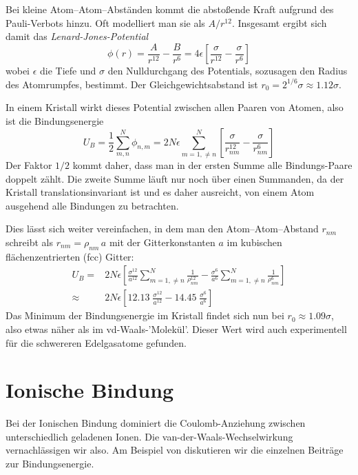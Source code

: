 Bei kleine Atom--Atom--Abständen kommt die abstoßende Kraft aufgrund des Pauli-Verbots hinzu. Oft modelliert man sie als $A/r^{12}$. Insgesamt ergibt sich damit das \emph{Lenard-Jones-Potential}
\begin{equation}
\phi(r) = \frac{A}{r^{12}} - \frac{B}{r^{6}} = 4 \epsilon \left[ \frac{\sigma}{r^{12}} -  \frac{\sigma}{r^{6}} \right]
\end{equation}
wobei $\epsilon$ die Tiefe und $\sigma$ den Nulldurchgang des Potentials, sozusagen den Radius des Atomrumpfes, bestimmt. Der Gleichgewichtsabstand ist $r_0 = 2^{1/6} \sigma \approx 1.12 \sigma$.

In einem Kristall wirkt dieses Potential zwischen allen Paaren von Atomen, also ist die Bindungsenergie 
\begin{equation}
U_B = \frac{1}{2} \sum_{m,n}^N \phi_{n,m} = 
2 N \epsilon \sum_{m=1,   \neq n}^N 
\left[ 
\frac{\sigma}{r_{nm}^{12}} -  \frac{\sigma}{r_{nm}^{6}} 
\right]
\end{equation}
Der Faktor $1/2$ kommt daher, dass man in der ersten Summe alle Bindungs-Paare doppelt zählt. Die zweite Summe läuft nur noch über einen Summanden, da der Kristall translationsinvariant ist und es daher ausreicht, von einem Atom ausgehend alle Bindungen zu betrachten.

Dies lässt sich weiter vereinfachen, in dem man den Atom--Atom--Abstand $r_{nm}$ schreibt als $r_{nm} = \rho_{nm} \, a$  mit der Gitterkonstanten $a$ im kubischen flächenzentrierten (fcc) Gitter:
\begin{align}
U_B = & 
2 N \epsilon 
\left[ 
\frac{\sigma^{12}}{a^{12}}
\sum_{m=1,   \neq n}^N  \frac{1}{\rho_{nm}^{12}} 
-
\frac{\sigma^{6}}{a^{6}}
\sum_{m=1,   \neq n}^N  \frac{1}{\rho_{nm}^{6}} 
\right] \\
\approx & 
2 N \epsilon 
\left[ 
12.13 \; \frac{\sigma^{12}}{a^{12}}
-
14.45 \; \frac{\sigma^{6}}{a^{6}}
\right] 
\end{align}
Das Minimum der Bindungsenergie im Kristall findet sich nun bei $r_0 \approx 1.09 \sigma$, also etwas näher als im vd-Waals-'Molekül'. Dieser Wert wird auch experimentell für die schwereren Edelgasatome gefunden.

\section{Ionische Bindung}

Bei der Ionischen Bindung dominiert die Coulomb-Anziehung zwischen unterschiedlich geladenen Ionen. Die van-der-Waals-Wechselwirkung vernachlässigen wir also. Am Beispiel von  diskutieren wir die einzelnen Beiträge zur Bindungsenergie.

